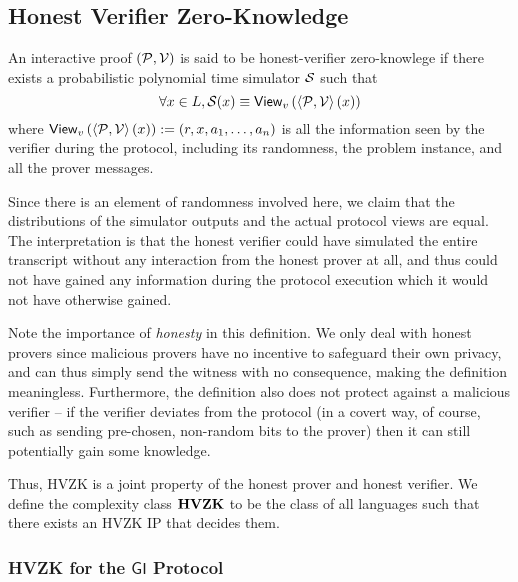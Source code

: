 \subsection{Honest Verifier Zero-Knowledge}

\begin{definition}
	An interactive proof $(\mathcal{P},\mathcal{V})$ is said to be honest-verifier zero-knowlege if there exists a probabilistic polynomial time simulator $\mathcal{S}$ such that
	$$\forall x\in L, \mathcal{S}(x)\equiv\mathsf{View}_v\left(\left\langle\mathcal{P},\mathcal{V}\right\rangle(x)\right)$$
	where $\mathsf{View}_v\left(\left\langle\mathcal{P},\mathcal{V}\right\rangle(x)\right):=(r,x,a_1,\dots,a_n)$ is all the information seen by the verifier during the protocol, including its randomness, the problem instance, and all the prover messages.
\end{definition}

Since there is an element of randomness involved here, we claim that the distributions of the simulator outputs and the actual protocol views are equal. The interpretation is that the honest verifier could have simulated the entire transcript without any interaction from the honest prover at all, and thus could not have gained any information during the protocol execution which it would not have otherwise gained.

Note the importance of \textit{honesty} in this definition. We only deal with honest provers since malicious provers have no incentive to safeguard their own privacy, and can thus simply send the witness with no consequence, making the definition meaningless. Furthermore, the definition also does not protect against a malicious verifier -- if the verifier deviates from the protocol (in a covert way, of course, such as sending pre-chosen, non-random bits to the prover) then it can still potentially gain some knowledge.

Thus, HVZK is a joint property of the honest prover and honest verifier. We define the complexity class $\mathbf{HVZK}$ to be the class of all languages such that there exists an HVZK IP that decides them.

\subsubsection{HVZK for the $\mathsf{GI}$ Protocol}

